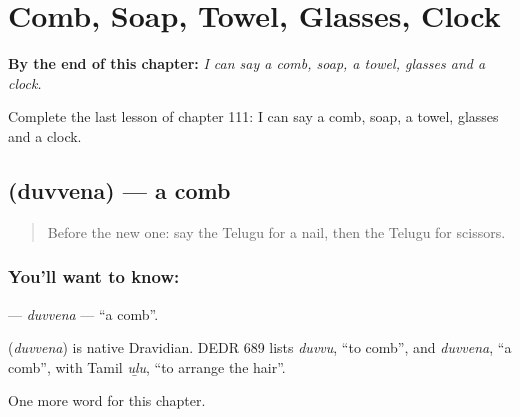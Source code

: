 
\chapter{Comb, Soap, Towel, Glasses, Clock}
\label{ch:te-comb-soap-towel-glasses-clock}

\begin{chapteropening}
\textbf{By the end of this chapter:} \emph{I can say a comb, soap, a towel, glasses and a clock.}

Complete the last lesson of chapter 111: I can say a comb, soap, a towel, glasses and a clock.
\end{chapteropening}

\section[\texorpdfstring{\te{దువ్వెన} (duvvena)}{దువ్వెన (duvvena)}]{ (duvvena) — a comb}

\label{lesson:TE-C111-duvvena}



\begin{quote}
Before the new one: say the Telugu for a nail, then the Telugu for scissors.
\end{quote}

\subsection*{You'll want to know: }
\textbf{} — \emph{duvvena} — \textquotedblleft{}a comb\textquotedblright{}.

\begin{cousinweb}
\textbf{} (\emph{duvvena}) is native Dravidian. DEDR 689 lists \emph{duvvu}, \textquotedblleft{}to comb\textquotedblright{}, and \emph{duvvena}, \textquotedblleft{}a comb\textquotedblright{}, with Tamil \emph{uḻu}, \textquotedblleft{}to arrange the hair\textquotedblright{}.
\end{cousinweb}

\begin{grammarlens}[title={What you've built}]
One more word for this chapter.
\end{grammarlens}

